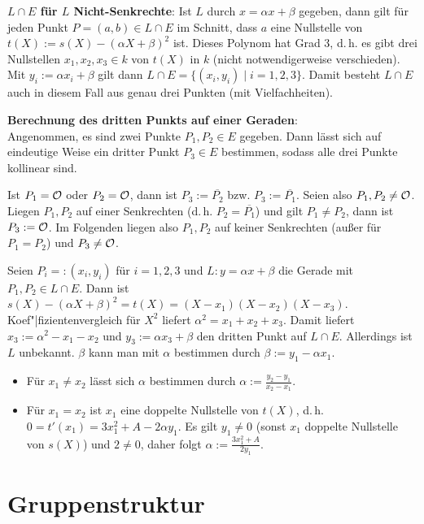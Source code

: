 \textbf{$L \cap E$ für $L$ Nicht-Senkrechte}:
Ist $L$ durch $x = \alpha x + \beta$ gegeben, dann gilt für jeden Punkt $P = (a, b) \in L \cap E$
im Schnitt, dass $a$ eine Nullstelle von $t(X) := s(X) - (\alpha X + \beta)^2$ ist.
Dieses Polynom hat Grad 3, d.\,h. es gibt drei Nullstellen $x_1, x_2, x_3 \in k$ von $t(X)$ in $k$
(nicht notwendigerweise verschieden).
Mit $y_i := \alpha x_i + \beta$ gilt dann $L \cap E = \{(x_i, y_i) \;|\; i = 1, 2, 3\}$.
Damit besteht $L \cap E$ auch in diesem Fall aus genau drei Punkten (mit Vielfachheiten).

\linie

\textbf{Berechnung des dritten Punkts auf einer Geraden}:\\
Angenommen, es sind zwei Punkte $P_1, P_2 \in E$ gegeben.
Dann lässt sich auf eindeutige Weise ein dritter Punkt $P_3 \in E$ bestimmen,
sodass alle drei Punkte kollinear sind.

Ist $P_1 = \mathcal{O}$ oder $P_2 = \mathcal{O}$, dann ist $P_3 := \overline{P_2}$ bzw. $P_3 := \overline{P_1}$.
Seien also $P_1, P_2 \not= \mathcal{O}$.
Liegen $P_1, P_2$ auf einer Senkrechten (d.\,h. $P_2 = \overline{P_1}$)
und gilt $P_1 \not= P_2$, dann ist $P_3 := \mathcal{O}$.
Im Folgenden liegen also $P_1, P_2$ auf keiner Senkrechten
(außer für $P_1 = P_2$) und $P_3 \not= \mathcal{O}$.

Seien $P_i =: (x_i, y_i)$ für $i = 1, 2, 3$ und $L\colon y = \alpha x + \beta$ die Gerade
mit $P_1, P_2 \in L \cap E$.
Dann ist $s(X) - (\alpha X + \beta)^2 = t(X) = (X - x_1) (X - x_2) (X - x_3)$.
Koef"|fizientenvergleich für $X^2$ liefert $\alpha^2 = x_1 + x_2 + x_3$.
Damit liefert $x_3 := \alpha^2 - x_1 - x_2$ und $y_3 := \alpha x_3 + \beta$ den dritten Punkt auf
$L \cap E$.
Allerdings ist $L$ unbekannt.
$\beta$ kann man mit $\alpha$ bestimmen durch $\beta := y_1 - \alpha x_1$.
\begin{itemize}
    \item
    Für $x_1 \not= x_2$ lässt sich $\alpha$ bestimmen durch
    $\alpha := \frac{y_2 - y_1}{x_2 - x_1}$.

    \item
    Für $x_1 = x_2$ ist $x_1$ eine doppelte Nullstelle von $t(X)$,
    d.\,h. $0 = t'(x_1) = 3x_1^2 + A - 2\alpha y_1$.
    Es gilt $y_1 \not= 0$ (sonst $x_1$ doppelte Nullstelle von $s(X)$) und $2 \not= 0$,
    daher folgt $\alpha := \frac{3x_1^2 + A}{2y_1}$.
\end{itemize}

\pagebreak

\section{%
    Gruppenstruktur%
}

